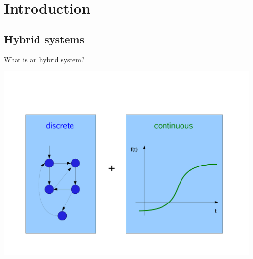 \section{Introduction}
\subsection{Hybrid systems}
\begin{frame}{What is an hybrid system?}
\begin{center}
\vspace*{-1.5cm}
\includegraphics[width=\columnwidth]{images/cs.pdf}
\end{center}
\end{frame}

